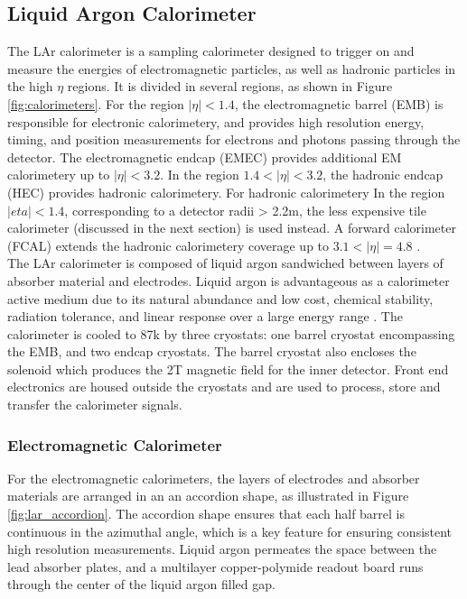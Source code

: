\subsection{Liquid Argon Calorimeter}
The LAr calorimeter is a sampling calorimeter designed to trigger on and measure the energies of electromagnetic particles, as well as hadronic particles in the high $\eta$ regions. It is divided in several regions, as shown in Figure \ref{fig:calorimeters}. For the region $|\eta| < 1.4$, the electromagnetic barrel (EMB) is responsible for electronic calorimetery, and provides high resolution energy, timing, and position measurements for electrons and photons passing through the detector. The electromagnetic endcap (EMEC) provides additional EM calorimetery up to $|\eta|<3.2$. In the region $1.4 < |\eta| < 3.2$, the hadronic endcap (HEC) provides hadronic calorimetery. For hadronic calorimetery In the region $|eta| < 1.4$, corresponding to a detector radii > 2.2m, the less expensive tile calorimeter (discussed in the next section) is used instead. A forward calorimeter (FCAL) extends the hadronic calorimetery coverage up to $3.1 < |\eta| = 4.8$ \cite{lar_tdr}. \\
 
The LAr calorimeter is composed of liquid argon sandwiched between layers of absorber material and electrodes. Liquid argon is advantageous as a calorimeter active medium due to its natural abundance and low cost, chemical stability, radiation tolerance, and linear response over a large energy range \cite{lar_ssc}. The calorimeter is cooled to 87k by three cryostats: one barrel cryostat encompassing the EMB, and two endcap cryostats. The barrel cryostat also encloses the solenoid which produces the 2T magnetic field for the inner detector. Front end electronics are housed outside the cryostats and are used to process, store and transfer the calorimeter signals. \\ 

\subsubsection{Electromagnetic Calorimeter}
For the electromagnetic calorimeters, the layers of electrodes and absorber materials are arranged in an an accordion shape, as illustrated in Figure \ref{fig:lar_accordion}. The accordion shape ensures that each half barrel is continuous in the azimuthal angle, which is a key feature for ensuring consistent high resolution measurements. Liquid argon permeates the space between the lead absorber plates, and a multilayer copper-polymide readout board runs through the center of the liquid argon filled gap. \\

